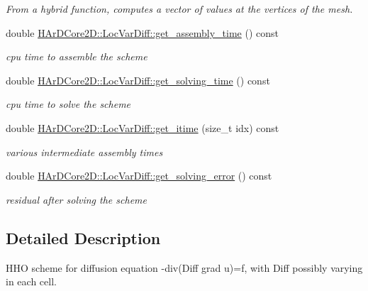 \begin{DoxyCompactItemize}
\begin{DoxyCompactList}\small\item\em From a hybrid function, computes a vector of values at the vertices of the mesh. \end{DoxyCompactList}\item 
\mbox{\label{group__HHO__locvar_gae772fea2b994fc7b91bf5464cdc3ba1e}} 
double \hyperlink{group__HHO__locvar_gae772fea2b994fc7b91bf5464cdc3ba1e}{H\+Ar\+D\+Core2\+D\+::\+Loc\+Var\+Diff\+::get\+\_\+assembly\+\_\+time} () const
\begin{DoxyCompactList}\small\item\em cpu time to assemble the scheme \end{DoxyCompactList}\item 
\mbox{\label{group__HHO__locvar_ga2a88d6a8c9b52e620a346f5d01e15bbb}} 
double \hyperlink{group__HHO__locvar_ga2a88d6a8c9b52e620a346f5d01e15bbb}{H\+Ar\+D\+Core2\+D\+::\+Loc\+Var\+Diff\+::get\+\_\+solving\+\_\+time} () const
\begin{DoxyCompactList}\small\item\em cpu time to solve the scheme \end{DoxyCompactList}\item 
\mbox{\label{group__HHO__locvar_gab6163348bd0188208049a1ad1c10d105}} 
double \hyperlink{group__HHO__locvar_gab6163348bd0188208049a1ad1c10d105}{H\+Ar\+D\+Core2\+D\+::\+Loc\+Var\+Diff\+::get\+\_\+itime} (size\+\_\+t idx) const
\begin{DoxyCompactList}\small\item\em various intermediate assembly times \end{DoxyCompactList}\item 
\mbox{\label{group__HHO__locvar_gaa2d93fad6446a1648cd898fcf19be40a}} 
double \hyperlink{group__HHO__locvar_gaa2d93fad6446a1648cd898fcf19be40a}{H\+Ar\+D\+Core2\+D\+::\+Loc\+Var\+Diff\+::get\+\_\+solving\+\_\+error} () const
\begin{DoxyCompactList}\small\item\em residual after solving the scheme \end{DoxyCompactList}\end{DoxyCompactItemize}


\subsection{Detailed Description}
H\+HO scheme for diffusion equation -\/div(Diff grad u)=f, with Diff possibly varying in each cell. 



